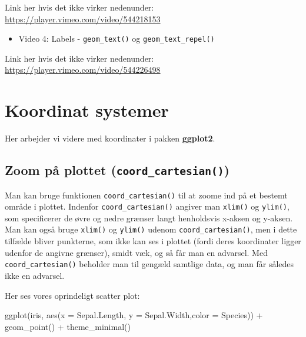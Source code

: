\documentclass[
]{book}
\newenvironment{Shaded}{\begin{snugshade}}{\end{snugshade}}
\newcommand{\AttributeTok}[1]{\textcolor[rgb]{0.77,0.63,0.00}{#1}}
\newcommand{\FunctionTok}[1]{\textcolor[rgb]{0.00,0.00,0.00}{#1}}
\newcommand{\NormalTok}[1]{#1}
\newcommand{\SpecialCharTok}[1]{\textcolor[rgb]{0.00,0.00,0.00}{#1}}
\providecommand{\tightlist}{%
  \setlength{\itemsep}{0pt}\setlength{\parskip}{0pt}}
\begin{document}
Link her hvis det ikke virker nedenunder: \url{https://player.vimeo.com/video/544218153}

\begin{itemize}
\tightlist
\item
  Video 4: Labels - \texttt{geom\_text()} og \texttt{geom\_text\_repel()}
\end{itemize}

Link her hvis det ikke virker nedenunder: \url{https://player.vimeo.com/video/544226498}

\hypertarget{koordinat-systemer}{%
\section{Koordinat systemer}\label{koordinat-systemer}}

Her arbejder vi videre med koordinater i pakken \textbf{ggplot2}.

\hypertarget{zoom-puxe5-plottet-coord_cartesian}{%
\subsection{\texorpdfstring{Zoom på plottet (\texttt{coord\_cartesian()})}{Zoom på plottet (coord\_cartesian())}}\label{zoom-puxe5-plottet-coord_cartesian}}

Man kan bruge funktionen \texttt{coord\_cartesian()} til at zoome ind på et bestemt område i plottet. Indenfor \texttt{coord\_cartesian()} angiver man \texttt{xlim()} og \texttt{ylim()}, som specificerer de øvre og nedre grænser langt henholdsvis x-aksen og y-aksen. Man kan også bruge \texttt{xlim()} og \texttt{ylim()} udenom \texttt{coord\_cartesian()}, men i dette tilfælde bliver punkterne, som ikke kan ses i plottet (fordi deres koordinater ligger udenfor de angivne grænser), smidt væk, og så får man en advarsel. Med \texttt{coord\_cartesian()} beholder man til gengæld samtlige data, og man får således ikke en advarsel.

Her ses vores oprindeligt scatter plot:

\begin{Shaded}
\begin{Highlighting}[]
\FunctionTok{ggplot}\NormalTok{(iris, }\FunctionTok{aes}\NormalTok{(}\AttributeTok{x =}\NormalTok{ Sepal.Length, }\AttributeTok{y =}\NormalTok{ Sepal.Width,}\AttributeTok{color =}\NormalTok{ Species)) }\SpecialCharTok{+}
  \FunctionTok{geom\_point}\NormalTok{() }\SpecialCharTok{+} 
  \FunctionTok{theme\_minimal}\NormalTok{() }
\end{Highlighting}
\end{Shaded}
\end{document}
